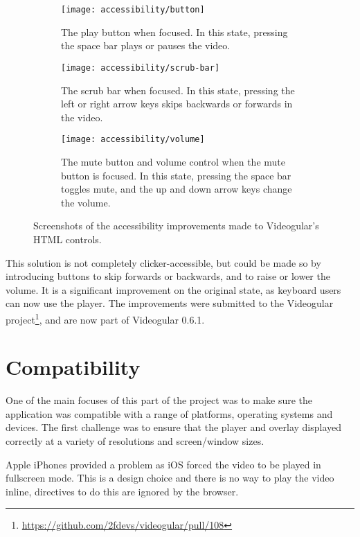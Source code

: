 \begin{figure}
	\begin{subfigure}[]{\textwidth}
		\texttt{[image: accessibility/button]}
		\caption{The play button when focused. In this state, pressing the space bar plays or pauses the video.}
		\label{Figure:Accessibility/Screenshots/Button}
	\end{subfigure}
	\begin{subfigure}[]{\textwidth}
		\texttt{[image: accessibility/scrub-bar]}
		\caption{The scrub bar when focused. In this state, pressing the left or right arrow keys skips backwards or forwards in the video.}
		\label{Figure:Accessibility/Screenshots/ScrubBar}
	\end{subfigure}
	\begin{subfigure}[]{\textwidth}
		\texttt{[image: accessibility/volume]}
		\caption{The mute button and volume control when the mute button is focused. In this state, pressing the space bar toggles mute, and the up and down arrow keys change the volume.}
		\label{Figure:Accessibility/Screenshots/Volume}
	\end{subfigure}
	\caption{Screenshots of the accessibility improvements made to Videogular's HTML controls.}
	\label{Figure:Accessibility/Screenshots}
\end{figure}

This solution is not completely clicker-accessible, but could be made so by introducing buttons to skip forwards or backwards, and to raise or lower the volume. It is a significant improvement on the original state, as keyboard users can now use the player. The improvements were submitted to the Videogular project\footnote{\url{https://github.com/2fdevs/videogular/pull/108}}, and are now part of Videogular 0.6.1.

\section{Compatibility} 
\label{Section:Compatibility}

One of the main focuses of this part of the project was to make sure the application was compatible with a range of platforms, operating systems and devices. The first challenge was to ensure that the player and overlay displayed correctly at a variety of resolutions and screen/window sizes. 

Apple iPhones provided a problem as iOS forced the video to be played in fullscreen mode. This is a design choice and there is no way to play the video inline, directives to do this are ignored by the browser.

